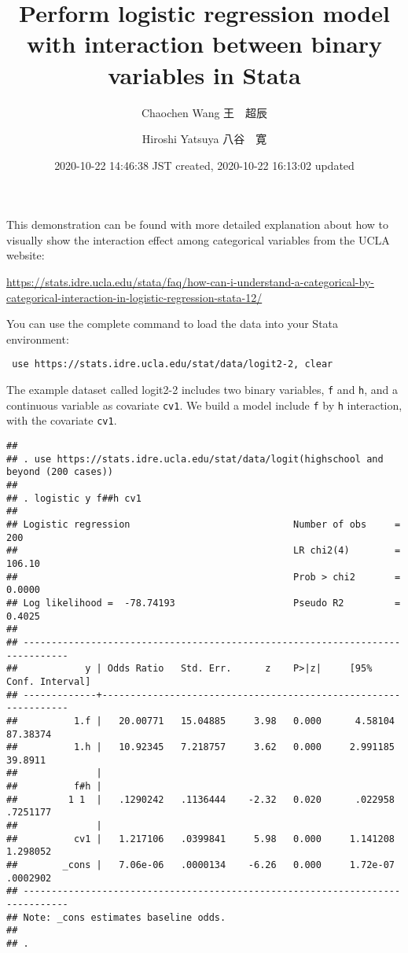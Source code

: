\documentclass[
]{article}
\title{Perform logistic regression model with interaction between binary
variables in Stata}
\author{Chaochen Wang \textbar{} 王　超辰 \and Hiroshi Yatsuya
\textbar{} 八谷　寛}
\date{2020-10-22 14:46:38 JST created, 2020-10-22 16:13:02 updated}
\begin{document}
\maketitle

This demonstration can be found with more detailed explanation about how
to visually show the interaction effect among categorical variables from
the UCLA website:

\url{https://stats.idre.ucla.edu/stata/faq/how-can-i-understand-a-categorical-by-categorical-interaction-in-logistic-regression-stata-12/}

You can use the complete command to load the data into your Stata
environment:

\begin{verbatim}
 use https://stats.idre.ucla.edu/stat/data/logit2-2, clear
\end{verbatim}

The example dataset called logit2-2 includes two binary variables,
\texttt{f} and \texttt{h}, and a continuous variable as covariate
\texttt{cv1}. We build a model include \texttt{f} by \texttt{h}
interaction, with the covariate \texttt{cv1}.

\begin{verbatim}
## 
## . use https://stats.idre.ucla.edu/stat/data/logit(highschool and beyond (200 cases))
## 
## . logistic y f##h cv1
## 
## Logistic regression                             Number of obs     =        200
##                                                 LR chi2(4)        =     106.10
##                                                 Prob > chi2       =     0.0000
## Log likelihood =  -78.74193                     Pseudo R2         =     0.4025
## 
## ------------------------------------------------------------------------------
##            y | Odds Ratio   Std. Err.      z    P>|z|     [95% Conf. Interval]
## -------------+----------------------------------------------------------------
##          1.f |   20.00771   15.04885     3.98   0.000      4.58104    87.38374
##          1.h |   10.92345   7.218757     3.62   0.000     2.991185     39.8911
##              |
##          f#h |
##         1 1  |   .1290242   .1136444    -2.32   0.020      .022958    .7251177
##              |
##          cv1 |   1.217106   .0399841     5.98   0.000     1.141208    1.298052
##        _cons |   7.06e-06   .0000134    -6.26   0.000     1.72e-07    .0002902
## ------------------------------------------------------------------------------
## Note: _cons estimates baseline odds.
## 
## .
\end{verbatim}
\end{document}
